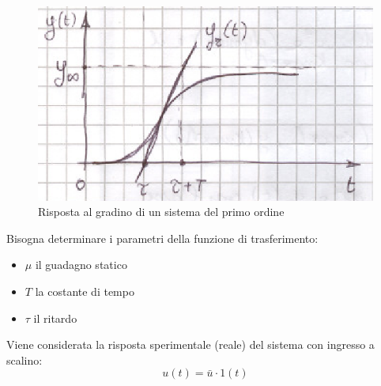\documentclass[a4paper]{report}
\begin{document}
\begin{figure}[!hbp]
  \begin{center}
    \includegraphics[scale=0.5]{./figures/metodoTangente02.png}
    \caption{Risposta al gradino di un sistema del primo ordine}
    \label{fig:rispostaGradino1Ordineyr}
  \end{center}
\end{figure}
Bisogna determinare i parametri della funzione di trasferimento:
\begin{itemize}
\item $\mu$ il guadagno statico
\item $T$ la costante di tempo
\item $\tau$ il ritardo
\end{itemize}
Viene considerata la risposta sperimentale (reale) del sistema con
ingresso a scalino:
\[
u(t) = \bar{u} \cdot 1(t)
\]
\end{document}
